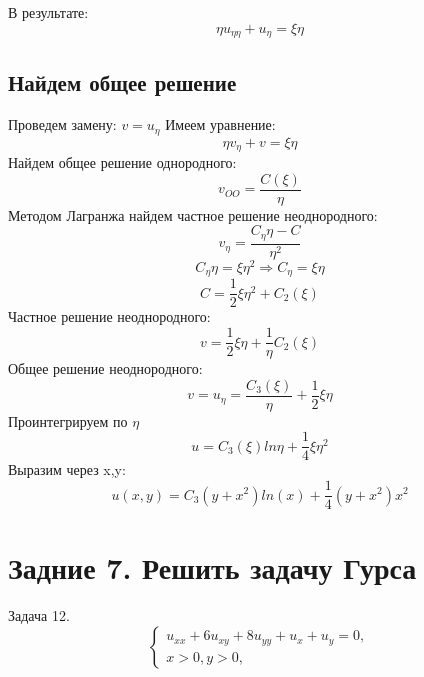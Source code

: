 \documentclass[12pt]{article}
\begin{document}
    В результате:
    $$\eta u_{\eta\eta} + u_\eta = \xi\eta$$

    \subsection{Найдем общее решение}
    Проведем замену: $v = u_\eta$
    Имеем уравнение:
    $$\eta v_\eta + v = \xi\eta$$
    Найдем общее решение однородного:
    $$v_{OO} = \frac{C(\xi)}{\eta}$$
    Методом Лагранжа найдем частное решение неоднородного:
    $$v_\eta = \frac{C_\eta\eta - C}{\eta^2}$$
    $$C_\eta\eta = \xi\eta^2 \Rightarrow C_\eta = \xi\eta$$
    $$C = \frac{1}{2} \xi\eta^2 + C_2(\xi)$$
    Частное решение неоднородного:
    $$v = \frac{1}{2}\xi\eta + \frac{1}{\eta}C_2(\xi)$$
    Общее решение неоднородного:
    $$v = u_\eta = \frac{C_3(\xi)}{\eta} + \frac{1}{2}\xi\eta$$
    Проинтегрируем по $\eta$
    $$u = C_3(\xi)ln\eta + \frac{1}{4}\xi\eta^2$$
    Выразим через x,y:
    $$u(x,y) = C_3(y+x^2)ln(x) + \frac{1}{4}(y+x^2)x^2$$

\section{Задние 7. Решить задачу Гурса}
Задача 12.
\begin{equation*}
    \begin{cases}
        u_{xx} + 6u_{xy} + 8u_{yy} + u_x + u_y = 0,
        \\
        x > 0, y>0,
        
    \end{cases}
\end{equation*}
\end{document}
